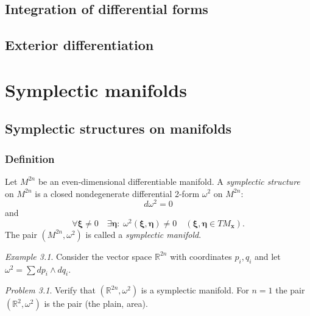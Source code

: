\documentclass{book}
\numberwithin{equation}{section}
\theoremstyle{plain}
\theoremstyle{definition}
\newtheorem*{defn*}{Definition}
\theoremstyle{remark}
\theoremstyle{remark}
\newtheorem*{ex*}{Example}
\newtheorem*{prob*}{Problem}
\begin{document}
\section{Integration of differential forms}

\section{Exterior differentiation}


\chapter{Symplectic manifolds}

\section{Symplectic structures on manifolds}

\subsection{Definition}



Let $M^{2n}$ be an even-dimensional differentiable manifold.
A \emph{symplectic structure} on $M^{2n}$ is a closed nondegenerate differential 2-form
$\omega^2$ on $M^{2n}$:
$$
d\omega^2 = 0
$$
and
$$
\forall \pmb \xi \ne 0
\quad
\exists \pmb \eta:
\;
\omega^2(\pmb \xi, \pmb \eta) \ne 0
\quad
(\pmb \xi, \pmb \eta \in TM_{\mathbf x}).
$$
The pair $(M^{2n}, \omega^2)$ is called
a \emph{symplectic manifold}.

\begin{ex*}
  Consider the vector space $\mathbb R^{2n}$
  with coordinates $p_i, q_i$ and let
  $\omega^2 = \sum d p_i \wedge dq_i$.
\end{ex*}

\begin{prob*}
  Verify that $(\mathbb R^{2n}, \omega^2)$
  is a symplectic manifold.
  For $n = 1$ the pair $(\mathbb R^2, \omega^2)$
  is the pair (the plain, area).

\end{prob*}
\end{document}
